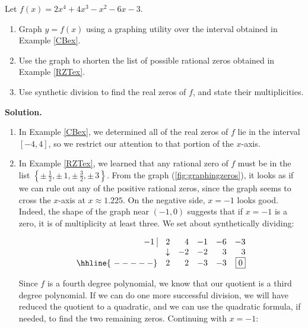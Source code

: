 \begin{ex}  Let $f(x) = 2x^4+4x^3-x^2-6x-3$.  

\begin{enumerate}

\item  Graph $y=f(x)$ using a graphing utility over the interval  obtained in Example \ref{CBex}.

\item  Use the graph to shorten the list of possible rational zeros obtained in Example \ref{RZTex}.

\item  Use synthetic division to find the real zeros of $f$, and state their multiplicities.


\end{enumerate}

{\bf Solution.}

\begin{enumerate}

\item  In Example \ref{CBex}, we determined all of the real zeros of $f$ lie in the interval $[-4, 4]$, so we restrict our attention to that portion of the $x$-axis.

\item  In Example \ref{RZTex}, we learned that any rational zero of $f$ must be in the list $\left\{\pm \, \frac{1}{2}, \pm \, 1, \pm \, \frac{3}{2}, \pm \, 3\right\}$.  From the graph (\autoref{fig:graphingzeros}), it looks as if we can rule out any of the positive rational zeros, since the graph seems to cross the $x$-axis at $x \approx 1.225$.  On the negative side, $x=-1$ looks good. Indeed,  the shape  of the graph near $(-1,0)$ suggests that if $x=-1$ is a zero, it is of multiplicity at least three.  We set about synthetically dividing:
 
\[\begin{array}{rrrrrr}

 -1 \, \, \vline& 2 & 4 & -1  & -6 & -3 \\

  & \downarrow     &  -2  &  -2  & 3 & 3\\ \hhline{~-----} 
  
  &  2            &   2  & -3 & -3 &  \fbox{$0$}  \\

\end{array}\]

Since $f$ is a fourth degree polynomial, we know that our quotient is a third degree polynomial.  If we can do one more successful division, we will have reduced the quotient  to a quadratic, and we can use the quadratic formula, if needed, to find the two  remaining  zeros.  Continuing with $x=-1$:


\end{enumerate}
\end{ex}
